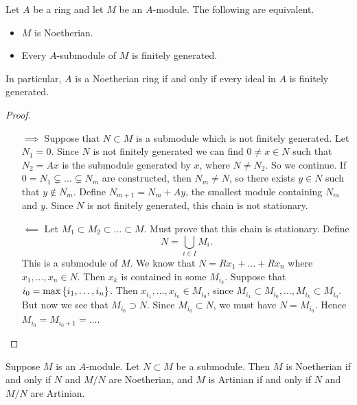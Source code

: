 \begin{proposition}
Let $ A $ be a ring and let $ M $ be an $ A $-module. The following are equivalent.
\begin{itemize}
\item $ M $ is Noetherian.
\item Every $ A $-submodule of $ M $ is finitely generated.
\end{itemize}
In particular, $ A $ is a Noetherian ring if and only if every ideal in $ A $ is finitely generated.
\end{proposition}

\begin{proof}
\hfill
\begin{itemize}
\item[$ \implies $] Suppose that $ N \subset M $ is a submodule which is not finitely generated. Let $ N_1 = 0 $. Since $ N $ is not finitely generated we can find $ 0 \ne x \in N $ such that $ N_2 = Ax $ is the submodule generated by $ x $, where $ N \ne N_2 $. So we continue. If $ 0 = N_1 \subsetneq \dots \subsetneq N_m $ are constructed, then $ N_m \ne N $, so there exists $ y \in N $ such that $ y \notin N_m $. Define $ N_{m + 1} = N_m + Ay $, the smallest module containing $ N_m $ and $ y $. Since $ N $ is not finitely generated, this chain is not stationary.
\item[$ \impliedby $] Let $ M_1 \subset M_2 \subset \dots \subset M $. Must prove that this chain is stationary. Define
$$ N = \bigcup_{i \in I} M_i. $$
This is a submodule of $ M $. We know that $ N = Rx_1 + \dots + Rx_n $ where $ x_1, \dots, x_n \in N $. Then $ x_k $ is contained in some $ M_{i_k} $. Suppose that $ i_0 = \max\cbr{i_1, \dots, i_n} $. Then $ x_{i_1}, \dots, x_{i_n} \in M_{i_0} $, since $ M_{i_1} \subset M_{i_0}, \dots, M_{i_k} \subset M_{i_0} $. But now we see that $ M_{i_0} \supset N $. Since $ M_{i_0} \subset N $, we must have $ N = M_{i_0} $. Hence $ M_{i_0} = M_{i_0 + 1} = \dots $.
\end{itemize}
\end{proof}

\begin{proposition}
\label{prop:11.4}
Suppose $ M $ is an $ A $-module. Let $ N \subset M $ be a submodule. Then $ M $ is Noetherian if and only if $ N $ and $ M / N $ are Noetherian, and $ M $ is Artinian if and only if $ N $ and $ M / N $ are Artinian.
\end{proposition}

